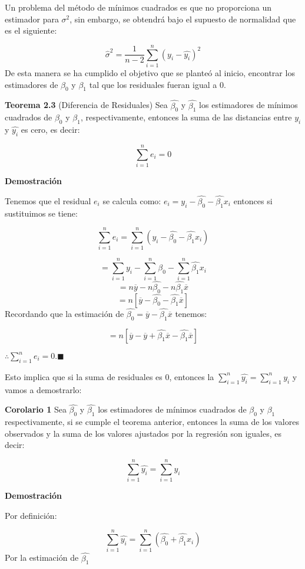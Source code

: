 \documentclass[
  a4paper,
  oneside,
  openany]{book}
\begin{document}
Un problema del método de mínimos cuadrados es que no proporciona un estimador para \(\sigma^2\), sin embargo, se obtendrá bajo el supuesto de normalidad que es el siguiente:

\[\hat{\sigma}^2=\frac{1}{n-2}\sum_{i=1}^{n}(y_{i}-\hat{y_{i}})^2\]
De esta manera se ha cumplido el objetivo que se planteó al inicio, encontrar los estimadores de \(\beta_{0}\) y \(\beta_{1}\) tal que los residuales fueran igual a 0.

\textbf{Teorema 2.3} (Diferencia de Residuales) Sea \(\hat{\beta_{0}}\) y \(\hat{\beta_{1}}\) los estimadores de mínimos cuadrados de \(\beta_{0}\) y \(\beta_{1}\), respectivamente, entonces la suma de las distancias entre \(y_{i}\) y \(\hat{y_{i}}\) es cero, es decir:

\[\sum_{i=1}^{n}e_{i}=0\]

\textbf{Demostración}

Tenemos que el residual \(e_{i}\) se calcula como: \(e_{i}=y_{i}-\hat{\beta_{0}}-\hat{\beta_1}x_{i}\) entonces si sustituimos se tiene:

\[\sum_{i=1}^{n}e_{i}=\sum_{i=1}^{n}\left(y_{i}-\hat{\beta_{0}}-\hat{\beta_1}x_{i}\right)\]

\[=\sum_{i=1}^{n}y_{i}-\sum_{i=1}^{n}\hat{\beta_{0}}-\sum_{i=1}^{n}\hat{\beta_{1}}x_{i}\]
\[=n\overline{y}-n\hat{\beta_{0}}-n\hat{\beta_{1}}\overline{x}\]
\[=n\left[\overline{y}-\hat{\beta_{0}}-\hat{\beta_{1}}\overline{x}\right]\]
Recordando que la estimación de \(\hat{\beta_{0}}=\overline{y}-\hat{\beta_{1}}\overline{x}\) tenemos:

\[=n\left[\overline{y}-\overline{y}+\hat{\beta_{1}}\overline{x}-\hat{\beta_{1}}\overline{x}\right]\]

\(\therefore \sum_{i=1}^{n}e_{i}=0. \blacksquare\)

Esto implica que si la suma de residuales es 0, entonces la \(\sum_{i=1}^{n}\hat{y_{i}}=\sum_{i=1}^{n}y_{i}\) y vamos a demostrarlo:

\textbf{Corolario 1} Sea \(\hat{\beta_{0}}\) y \(\hat{\beta_{1}}\) los estimadores de mínimos cuadrados de \(\beta_{0}\) y \(\beta_{1}\) respectivamente, si se cumple el teorema anterior, entonces la suma de los valores observados y la suma de los valores ajustados por la regresión son iguales, es decir:

\[\sum_{i=1}^{n}\hat{y_{i}}=\sum_{i=1}^{n}y_{i}\]

\textbf{Demostración}

Por definición:

\[\sum_{i=1}^{n}\hat{y_{i}}=\sum_{i=1}^{n}\left(\hat{\beta_{0}}+\hat{\beta_{1}}x_{i}\right)\]
Por la estimación de \(\hat{\beta_{1}}\)
\end{document}
